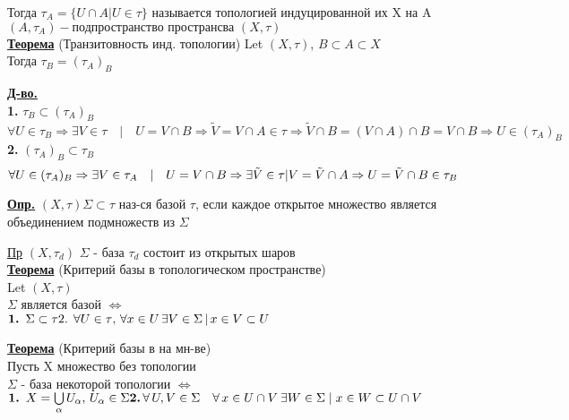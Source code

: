 \documentclass[12pt]{article}
\begin{document}
Тогда $\tau_A = \{U \cap A | U \in \tau \}$ называется топологией индуцированной
их X на A\\
$ (A, \tau_A) - \text{подпространство пространсва } (X, \tau) $ \\

\underline{\textbf{Теорема}} (Транзитовность инд. топологии)
Let $(X, \tau)$, $ B \subset A \subset X $ \\
Тогда $\tau_B = (\tau_A)_B $ 

\underline{\textbf{Д-во.}}\\
\textbf{\textbf{1.}} $ \tau_B \subset (\tau_A)_B $
\begin{equation*}
    \forall U \in \tau_B \Rightarrow \exists V \in \tau \quad | \quad
    U = V \cap B \Rightarrow
    \tilde{V} = V \cap A \in \tau \Rightarrow \tilde{V} \cap B = (V \cap A)
    \cap B = V \cap B \Rightarrow U \in (\tau_A)_B
\end{equation*}
\textbf{2.} $ (\tau_A)_B \subset \tau_B $\\
\begin{equation*}
    \forall U \in (\tau_A)_B \Rightarrow \exists V \in \tau_A \quad | \quad
    U = V \cap B \Rightarrow \exists \tilde{V} \in \tau | \\
    V = \tilde{V} \cap A \Rightarrow U = \tilde{V} \cap B \in \tau_B
\end{equation*}

\underline{\textbf{Опр.}} $ (X, \tau) \Sigma \subset \tau $ наз-ся базой $\tau$, если
каждое открытое множество является объединением подмножеств из $\Sigma$

\underline{Пр} $(X, \tau_d)$ $\Sigma$ - база $ \tau_d $ состоит из открытых шаров\\ 

\underline{\textbf{Теорема}} (Критерий базы в топологическом пространстве) \\ 
Let $ (X, \tau) $ \\
$\Sigma$ является базой $\Leftrightarrow$ \\
$ 
    \textbf{1. } \Sigma \subset \tau \\ 
    \text{2. } \forall U \in \tau \text{, } \forall x \in U \, \exists V \in \Sigma
    \, | \, x \in V \subset U
$

\underline{\textbf{Теорема}} (Критерий базы в на мн-ве) \\ 
Пусть X множество без топологии \\
$ \Sigma $ - база некоторой топологии $\Leftrightarrow$ \\
$
    \textbf{1. } X = \bigcup\limits_\alpha U_\alpha, \, U_\alpha \in \Sigma\\
    \textbf{2.} \, \forall \, U, V \in \Sigma \quad \forall \, x \in U \cap V \:
    \exists W \in \Sigma \; | \; x \in W \subset U \cap V
$
\end{document}
